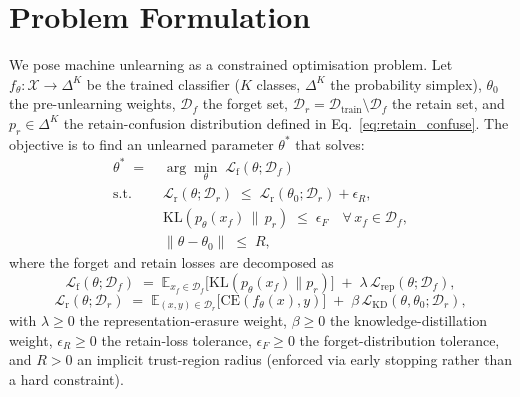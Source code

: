 \documentclass{article}
\newcommand{\E}{\mathbb{E}}
\newcommand{\KL}{\mathrm{KL}}
\newcommand{\CE}{\mathrm{CE}}
\newcommand{\Df}{\mathcal{D}_f}
\newcommand{\Dr}{\mathcal{D}_r}
\newcommand{\lossf}{\mathcal{L}_{\mathrm{f}}}
\newcommand{\lossr}{\mathcal{L}_{\mathrm{r}}}
\newcommand{\lossrep}{\mathcal{L}_{\mathrm{rep}}}
\newcommand{\losskd}{\mathcal{L}_{\mathrm{KD}}}
\newcommand{\new}[1]{{\color{orange}#1}}
\begin{document}
\new{
\section{Problem Formulation}\label{sec:problem}

We pose machine unlearning as a constrained optimisation problem.
Let $f_\theta : \mathcal{X} \to \Delta^K$ be the trained classifier ($K$ classes, $\Delta^K$ the probability simplex), $\theta_0$ the pre-unlearning weights, $\Df$ the forget set, $\Dr = \mathcal{D}_{\text{train}} \setminus \Df$ the retain set, and $p_r \in \Delta^K$ the retain-confusion distribution defined in Eq.~\ref{eq:retain_confuse}. The objective is to find an unlearned parameter $\theta^*$ that solves:
\begin{equation}\label{eq:problem}
\begin{aligned}
\theta^* \;=\; & \arg\min_{\theta} \; \lossf(\theta;\Df) \\
\text{s.t.} \quad & \lossr(\theta;\Dr) \;\le\; \lossr(\theta_0;\Dr) + \epsilon_R, \\
                  & \KL\!\left(p_\theta(x_f) \,\|\, p_r\right) \;\le\; \epsilon_F \quad \forall\, x_f \in \Df, \\
                  & \|\theta - \theta_0\| \;\le\; R,
\end{aligned}
\end{equation}
where the forget and retain losses are decomposed as
\[
\lossf(\theta;\Df) \;=\; \E_{x_f \in \Df}\!\big[\KL(p_\theta(x_f)\|p_r)\big] \;+\; \lambda \, \lossrep(\theta;\Df),
\]
\[
\lossr(\theta;\Dr) \;=\; \E_{(x,y)\in\Dr}\!\big[\CE(f_\theta(x), y)\big] \;+\; \beta \, \losskd(\theta,\theta_0;\Dr),
\]
with $\lambda \ge 0$ the representation-erasure weight, $\beta \ge 0$ the knowledge-distillation weight, $\epsilon_R \ge 0$ the retain-loss tolerance, $\epsilon_F \ge 0$ the forget-distribution tolerance, and $R > 0$ an implicit trust-region radius (enforced via early stopping rather than a hard constraint).

}
\end{document}
